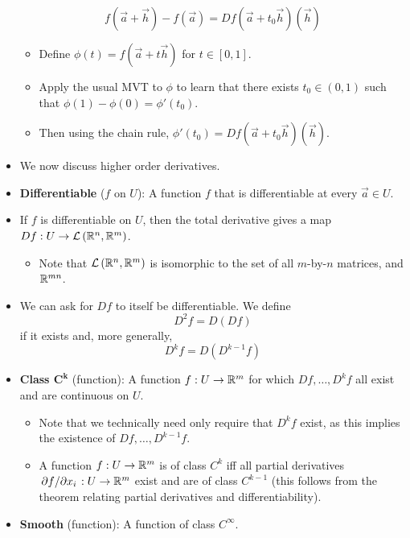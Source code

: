 \documentclass[../notes.tex]{subfiles}
\begin{document}
\begin{itemize}
    \begin{equation*}
        f(\vec{a}+\vec{h})-f(\vec{a}) = Df(\vec{a}+t_0\vec{h})(\vec{h})
    \end{equation*}
    \begin{itemize}
        \item Define $\phi(t)=f(\vec{a}+t\vec{h})$ for $t\in[0,1]$.
        \item Apply the usual MVT to $\phi$ to learn that there exists $t_0\in(0,1)$ such that $\phi(1)-\phi(0)=\phi'(t_0)$.
        \item Then using the chain rule, $\phi'(t_0)=Df(\vec{a}+t_0\vec{h})(\vec{h})$.
    \end{itemize}
    \item We now discuss higher order derivatives.
    \item \textbf{Differentiable} ($f$ on $U$): A function $f$ that is differentiable at every $\vec{a}\in U$.
    \item If $f$ is differentiable on $U$, then the total derivative gives a map $Df:U\to\mathcal{L}\left( \mathbb{R}^n,\mathbb{R}^m \right)$.
    \begin{itemize}
        \item Note that $\mathcal{L}\left( \mathbb{R}^n,\mathbb{R}^m \right)$ is isomorphic to the set of all $m$-by-$n$ matrices, and $\mathbb{R}^{mn}$.
    \end{itemize}
    \item We can ask for $Df$ to itself be differentiable. We define
    \begin{equation*}
        D^2f = D(Df)
    \end{equation*}
    if it exists and, more generally,
    \begin{equation*}
        D^kf = D(D^{k-1}f)
    \end{equation*}
    \item \textbf{Class $\bm{C^k}$} (function): A function $f:U\to\mathbb{R}^m$ for which $Df,\dots,D^kf$ all exist and are continuous on $U$.
    \begin{itemize}
        \item Note that we technically need only require that $D^kf$ exist, as this implies the existence of $Df,\dots,D^{k-1}f$.
        \item A function $f:U\to\mathbb{R}^m$ is of class $C^k$ iff all partial derivatives $\pdv*{f}{x_i}:U\to\mathbb{R}^m$ exist and are of class $C^{k-1}$ (this follows from the theorem relating partial derivatives and differentiability).
    \end{itemize}
    \item \textbf{Smooth} (function): A function of class $C^\infty$.

\end{itemize}
\end{document}

